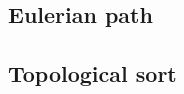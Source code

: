 \documentclass[a4paper]{article}
\begin{document}
\subsection{Eulerian path}

\subsection{Topological sort}
\end{document}
